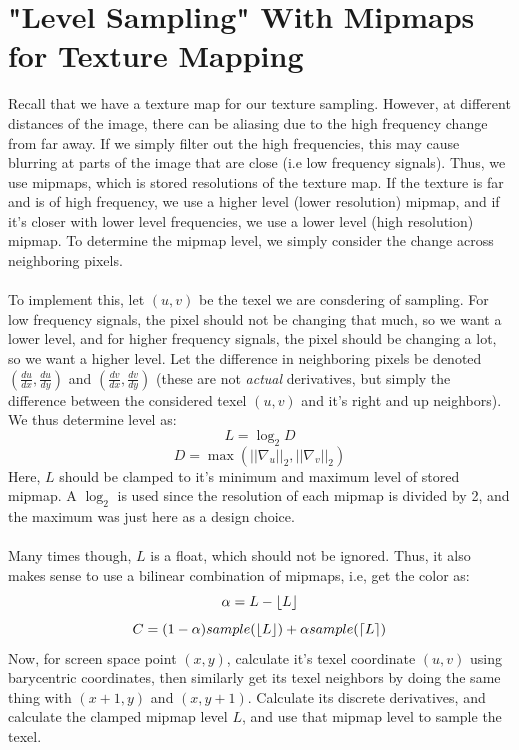 \documentclass{article}
\DeclarePairedDelimiter\ceil{\lceil}{\rceil}
\DeclarePairedDelimiter\floor{\lfloor}{\rfloor}
\begin{document}
\section{"Level Sampling" With Mipmaps for Texture Mapping}
Recall that we have a texture map for our texture sampling. However, at different distances of the image, there can be aliasing due to the high frequency change from far away. If we simply filter out the high frequencies, this may cause blurring at parts of the image that are close (i.e low frequency signals). Thus, we use mipmaps, which is stored resolutions of the texture map. If the texture is far and is of high frequency, we use a higher level (lower resolution) mipmap, and if it's closer with lower level frequencies, we use a lower level (high resolution) mipmap. To determine the mipmap level, we simply consider the change across neighboring pixels. 
\\
\\
To implement this, let $(u, v)$ be the texel we are consdering of sampling. For low frequency signals, the pixel should not be changing that much, so we want a lower level, and for higher frequency signals, the pixel should be changing a lot, so we want a higher level. Let the difference in neighboring pixels be denoted $(\frac{du}{dx}, \frac{du}{dy})$ and $(\frac{dv}{dx}, \frac{dv}{dy})$ (these are not \textit{actual} derivatives, but simply the difference between the considered texel $(u, v)$ and it's right and up neighbors). We thus determine level as:
$$L = \log_{2}D$$
$$D = \max (||\nabla_u||_2, ||\nabla_v||_2)$$
Here, $L$ should be clamped to it's minimum and maximum level of stored mipmap. A $\log_2$ is used since the resolution of each mipmap is divided by 2, and the maximum was just here as a design choice.
\\
\\
Many times though, $L$ is a float, which should not be ignored. Thus, it also makes sense to use a bilinear combination of mipmaps, i.e, get the color as:
$$\alpha = L - \floor*{L}$$
$$C = (1 - \alpha)sample(\floor*{L}) + \alpha sample(\ceil*{L})$$
Now, for screen space point $(x, y)$, calculate it's texel coordinate $(u, v)$ using barycentric coordinates, then similarly get its texel neighbors by doing the same thing with $(x + 1, y)$ and $(x, y + 1)$. Calculate its discrete derivatives, and calculate the clamped mipmap level $L$, and use that mipmap level to sample the texel. 
\end{document}
